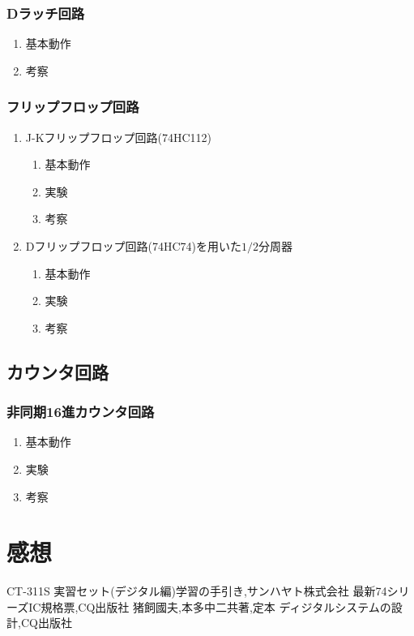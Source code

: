 \documentclass[twocolumn, 10pt,a4j]{jsarticle}
\begin{document}
  \subsubsection{Dラッチ回路}
    \begin{enumerate}
      \item 基本動作
      \item 考察
    \end{enumerate}
  \subsubsection{フリップフロップ回路}
    \begin{enumerate}
      \item J-Kフリップフロップ回路(74HC112)
        \begin{enumerate}
          \item 基本動作
          \item 実験
          \item 考察    
        \end{enumerate}
      \item Dフリップフロップ回路(74HC74)を用いた$1/2$分周器
        \begin{enumerate}
          \item 基本動作
          \item 実験
          \item 考察
        \end{enumerate}
    \end{enumerate}
\subsection{カウンタ回路}
  \subsubsection{非同期16進カウンタ回路}
  \begin{enumerate}
    \item 基本動作
    \item 実験
    \item 考察
  \end{enumerate}
\section{感想}


\begin{thebibliography}{3}
\bibitem{}CT-311S 実習セット(デジタル編)学習の手引き,サンハヤト株式会社
\bibitem{}最新74シリーズIC規格票,CQ出版社
\bibitem{}猪飼國夫,本多中二共著,定本 ディジタルシステムの設計,CQ出版社
\end{thebibliography}
\end{document}
